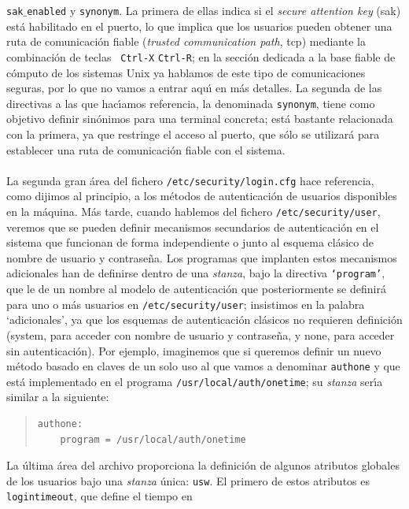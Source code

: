 {\tt sak$\_$enabled} y {\tt synonym}. La primera de ellas indica si el {\it
secure attention key} ({\sc sak}) est\'a habilitado en el puerto, lo que implica
que los usuarios pueden obtener una ruta de comunicaci\'on fiable ({\it trusted 
communication path}, {\sc tcp}) mediante la combinaci\'on de teclas {\tt 
Ctrl-X} {\tt Ctrl-R}; en la secci\'on dedicada a la base fiable de c\'omputo de
los sistemas Unix ya hablamos de este tipo de comunicaciones seguras, por lo que
no vamos a entrar aqu\'{\i} en m\'as detalles. La segunda de las directivas a 
las que hac\'{\i}amos referencia, la denominada {\tt synonym}, tiene como 
objetivo definir sin\'onimos para una terminal concreta; est\'a bastante 
relacionada con la primera, ya que restringe el acceso al puerto, que s\'olo se
utilizar\'a para establecer una ruta de comunicaci\'on fiable con el sistema.\\
\\La segunda gran \'area del fichero {\tt /etc/security/login.cfg} hace 
referencia, como dijimos al principio, a los m\'etodos de autenticaci\'on de 
usuarios disponibles en la m\'aquina. M\'as tarde, cuando hablemos del fichero
{\tt /etc/security/user}, veremos que se pueden definir mecanismos secundarios
de autenticaci\'on en el sistema que funcionan de forma independiente o junto
al esquema cl\'asico de nombre de usuario y contrase\~na. Los programas que
implanten estos mecanismos adicionales han de definirse dentro de una {\it 
stanza}, bajo la directiva {\tt `program'}, que le de un nombre al modelo de 
autenticaci\'on que posteriormente se
definir\'a para uno o m\'as usuarios en {\tt /etc/security/user}; insistimos en
la palabra `adicionales', ya que los esquemas de autenticaci\'on cl\'asicos no
requieren definici\'on ({\sc system}, para acceder con nombre de usuario y
contrase\~na, y {\sc none}, para acceder sin autenticaci\'on). Por ejemplo, 
imaginemos que si queremos definir un nuevo m\'etodo basado en claves de un
solo uso al que vamos a denominar {\tt authone} y que est\'a implementado en el 
programa {\tt /usr/local/auth/onetime}; su {\it stanza} ser\'{\i}a similar a la
siguiente:
\begin{quote}
\begin{verbatim}
authone:
    program = /usr/local/auth/onetime
\end{verbatim}
\end{quote}
La \'ultima \'area del archivo proporciona la definici\'on de algunos 
atributos globales de los usuarios bajo una {\it stanza} \'unica: {\tt usw}. El
primero de estos atributos es {\tt logintimeout}, que define el tiempo en 
